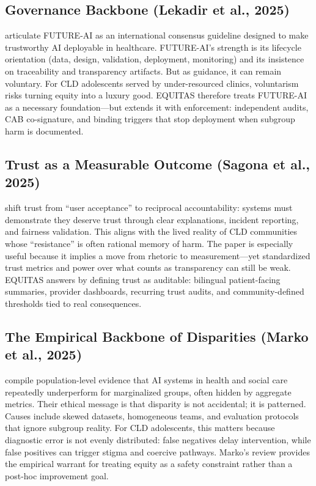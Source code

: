 \subsection{Governance Backbone (Lekadir et al., 2025)}
\citet{Lekadir2025} articulate FUTURE-AI as an international consensus guideline designed to make trustworthy AI deployable in healthcare. FUTURE-AI’s strength is its lifecycle orientation (data, design, validation, deployment, monitoring) and its insistence on traceability and transparency artifacts. But as guidance, it can remain voluntary. For CLD adolescents served by under-resourced clinics, voluntarism risks turning equity into a luxury good. EQUITAS therefore treats FUTURE-AI as a necessary foundation—but extends it with enforcement: independent audits, CAB co-signature, and binding triggers that stop deployment when subgroup harm is documented.

\subsection{Trust as a Measurable Outcome (Sagona et al., 2025)}
\citet{Sagona2025} shift trust from ``user acceptance'' to reciprocal accountability: systems must demonstrate they deserve trust through clear explanations, incident reporting, and fairness validation. This aligns with the lived reality of CLD communities whose ``resistance'' is often rational memory of harm. The paper is especially useful because it implies a move from rhetoric to measurement—yet standardized trust metrics and power over what counts as transparency can still be weak. EQUITAS answers by defining trust as auditable: bilingual patient-facing summaries, provider dashboards, recurring trust audits, and community-defined thresholds tied to real consequences.

\subsection{The Empirical Backbone of Disparities (Marko et al., 2025)}
\citet{Marko2025} compile population-level evidence that AI systems in health and social care repeatedly underperform for marginalized groups, often hidden by aggregate metrics. Their ethical message is that disparity is not accidental; it is patterned. Causes include skewed datasets, homogeneous teams, and evaluation protocols that ignore subgroup reality. For CLD adolescents, this matters because diagnostic error is not evenly distributed: false negatives delay intervention, while false positives can trigger stigma and coercive pathways. Marko’s review provides the empirical warrant for treating equity as a safety constraint rather than a post-hoc improvement goal.

